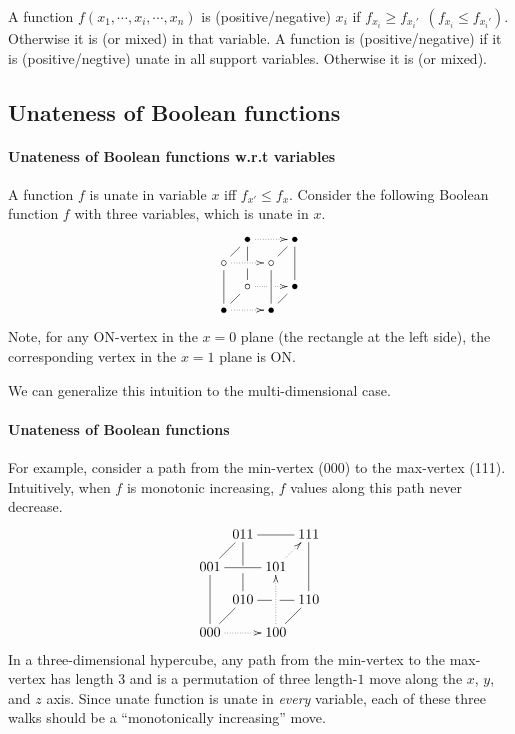 \documentclass{myproc}
\begin{document}
\begin{definition}
A function $f(x_1, \cdots, x_i, \cdots, x_n)$ is (positive/negative)
 $x_i$ if $f_{x_i} \ge f_{x_i'} 
\ \ (f_{x_i} \le f_{x_i'})$. Otherwise it is  (or mixed)
in that variable.
A function is (positive/negative)  if it is
(positive/negtive) unate in all support variables. Otherwise it is 
 (or mixed).
\end{definition}

\subsection{Unateness of Boolean functions}
\paragraph{Unateness of Boolean functions w.r.t variables}
A function $f$ is unate in variable $x$ iff $f_{x'} \le f_x$.
Consider the following Boolean function $f$ with three variables, which is
unate in $x$.
\[\xymatrix@!@-1.5pc{
& \bullet \ar@{.>}[rr]\ar@{-}'[d][dd]
	& & \bullet \ar@{-}[dd] \\
\circ \ar@{-}[ur]\ar@{.>}[rr]\ar@{-}[dd]
	& & \circ \ar@{-}[ur]\ar@{-}[dd] \\
& \circ \ar@{-} \ar@{.>}'[r][rr]
	& &  \bullet \\
\bullet \ar@{.>}[rr]\ar@{-}[ur]
& & \bullet \ar@{-}[ur] & 
}
\]
Note, for any ON-vertex 
in the $x = 0$ plane (the rectangle at the
left side), the corresponding vertex in the $x = 1$ plane is ON.

We can generalize this intuition to the multi-dimensional case.



\paragraph{Unateness of Boolean functions}
For example, consider a path from the min-vertex (000) to the
max-vertex (111).
Intuitively, when $f$ is monotonic increasing, $f$ 
values along this path never decrease.
{\tiny
\[\xymatrix@!@-1.8pc{
& 011 \ar@{-}[rr]\ar@{-}'[d][dd]
	& & 111 \ar@{-}[dd] \\
001 \ar@{-}[ur]\ar@{-}[rr]\ar@{-}[dd]
	& & 101 \ar@{.>}[ur]\ar@{<.}[dd] \\
& 010 \ar@{-} \ar@{-}'[r][rr]
	& & 110\\
000\ar@{.>}[rr]\ar@{-}[ur]
& & 100 \ar@{-}[ur]
}\]}
In a three-dimensional hypercube, any path from the
min-vertex to the max-vertex has length $3$ and is a permutation of
three length-$1$ move along the $x$, $y$, and $z$ axis.
Since unate function is unate in {\em every\/} variable, 
each of these three walks should be a ``monotonically increasing'' move.
\end{document}
